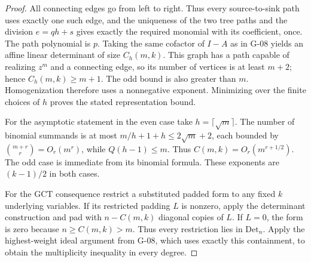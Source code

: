\begin{proof}
All connecting edges go from left to right. Thus every source-to-sink path uses exactly one such edge, and the uniqueness of the two tree paths and the division $e=qh+s$ gives exactly the required monomial with its coefficient, once. The path polynomial is $p$. Taking the same cofactor of $I-A$ as in G-08 yields an affine linear determinant of size $C_h(m,k)$. This graph has a path capable of realizing $z^m$ and a connecting edge, so its number of vertices is at least $m+2$; hence $C_h(m,k)\geq m+1$. The odd bound is also greater than $m$. Homogenization therefore uses a nonnegative exponent. Minimizing over the finite choices of $h$ proves the stated representation bound.

For the asymptotic statement in the even case take $h=\lceil\sqrt m\rceil$. The number of binomial summands is at most $m/h+1+h\leq2\sqrt m+2$, each bounded by $\binom{m+r}{r}=O_r(m^r)$, while $Q(h-1)\leq m$. Thus $C(m,k)=O_r(m^{r+1/2})$. The odd case is immediate from its binomial formula. These exponents are $(k-1)/2$ in both cases.

For the GCT consequence restrict a substituted padded form to any fixed $k$ underlying variables. If its restricted padding $L$ is nonzero, apply the determinant construction and pad with $n-C(m,k)$ diagonal copies of $L$. If $L=0$, the form is zero because $n\geq C(m,k)>m$. Thus every restriction lies in $\mathrm{Det}_n$. Apply the highest-weight ideal argument from G-08, which uses exactly this containment, to obtain the multiplicity inequality in every degree.
\end{proof}
